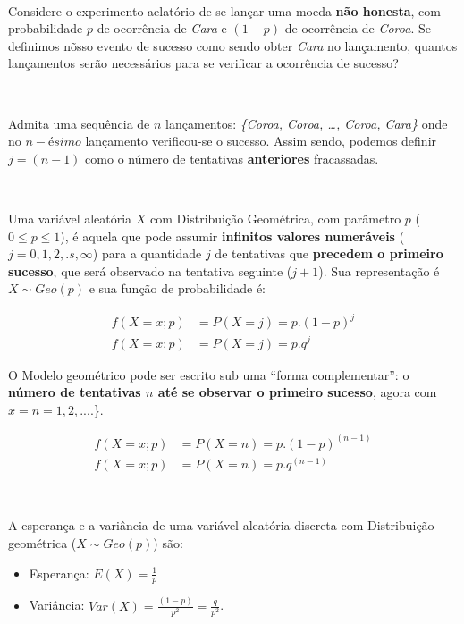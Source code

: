 \documentclass[
]{book}
\providecommand{\tightlist}{%
  \setlength{\itemsep}{0pt}\setlength{\parskip}{0pt}}
\begin{document}
~

Considere o experimento aelatório de se lançar uma moeda \textbf{não honesta}, com probabilidade \(p\) de ocorrência de \emph{Cara} e \((1-p)\) de ocorrência de \emph{Coroa}. Se definimos nõsso evento de sucesso como sendo obter \emph{Cara} no lançamento, quantos lançamentos serão necessários para se verificar a ocorrência de sucesso?

~

Admita uma sequência de \(n\) lançamentos: \emph{\{Coroa, Coroa, \ldots, Coroa, Cara\}} onde no \(n-ésimo\) lançamento verificou-se o sucesso. Assim sendo, podemos definir \(j=(n-1)\) como o número de tentativas \textbf{anteriores} fracassadas.

~

Uma variável aleatória \(X\) com Distribuição Geométrica, com parâmetro \(p\) (\(0 \le p \le1\)), é aquela que pode assumir \textbf{infinitos valores numeráveis} (\(j=0,1,2, .s, \infty\)) para a quantidade \(j\) de tentativas que \textbf{precedem o primeiro sucesso}, que será observado na tentativa seguinte (\(j+1\)). Sua representação é \(X\sim Geo(p)\) e sua função de probabilidade é:

\hfill\break

\begin{align*}
f(X=x; p) & = P(X=j) = p . (1-p)^{j} \\
f(X=x; p) & = P(X=j) = p . q^{j}
\end{align*}

\hfill\break

O Modelo geométrico pode ser escrito sub uma ``forma complementar'': o \textbf{número de tentativas \(n\) até se observar o primeiro sucesso}, agora com \(x=n=1, 2, ...\).\}.

\hfill\break

\begin{align*}
f(X=x; p) & = P(X=n) = p . (1-p)^{(n-1)} \\
f(X=x; p) & = P(X=n) = p . q^{(n-1)}  
\end{align*}

~

A esperança e a variância de uma variável aleatória discreta com Distribuição geométrica (\(X\sim Geo(p)\)) são:

\hfill\break

\begin{itemize}
\tightlist
\item
  Esperança: \(E(X) = \frac{1}{p}\)\\
\item
  Variância: \(Var(X) = \frac{(1-p)}{p^{2}} = \frac{q}{p^{2}}\).
\end{itemize}
\end{document}
